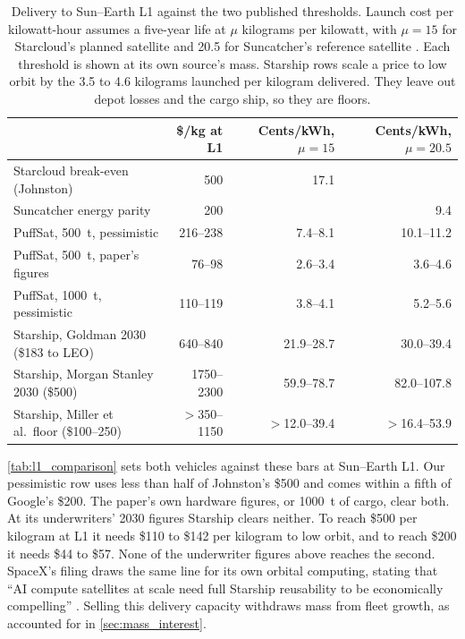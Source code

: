 \documentclass{article}
\begin{document}
\begin{table}[!htpb]
    \centering
    \small
    \caption{Delivery to Sun--Earth L1 against the two published thresholds. Launch cost per kilowatt-hour assumes a five-year life at $\mu$ kilograms per kilowatt, with $\mu = 15$ for Starcloud's planned satellite and 20.5 for Suncatcher's reference satellite \cite{bennici2026_johnston,aguera2026_suncatcher}. Each threshold is shown at its own source's mass. Starship rows scale a price to low orbit by the 3.5 to 4.6 kilograms launched per kilogram delivered. They leave out depot losses and the cargo ship, so they are floors.}
    \label{tab:l1_comparison}
    \begin{tabular}{|l|r|r|r|}\hline
        & \textbf{\$/kg at L1} & \textbf{Cents/kWh, $\mu = 15$} & \textbf{Cents/kWh, $\mu = 20.5$} \\\hline
        Starcloud break-even (Johnston) & 500 & 17.1 & \\\hline
        Suncatcher energy parity & 200 & & 9.4 \\\hline
        PuffSat, \SI{500}{\tonne}, pessimistic & 216--238 & 7.4--8.1 & 10.1--11.2 \\\hline
        PuffSat, \SI{500}{\tonne}, paper's figures & 76--98 & 2.6--3.4 & 3.6--4.6 \\\hline
        PuffSat, \SI{1000}{\tonne}, pessimistic & 110--119 & 3.8--4.1 & 5.2--5.6 \\\hline
        Starship, Goldman 2030 (\$183 to LEO) & 640--840 & 21.9--28.7 & 30.0--39.4 \\\hline
        Starship, Morgan Stanley 2030 (\$500) & 1750--2300 & 59.9--78.7 & 82.0--107.8 \\\hline
        Starship, Miller et al.\ floor (\$100--250) & $>$350--1150 & $>$12.0--39.4 & $>$16.4--53.9 \\\hline
    \end{tabular}
\end{table}

\autoref{tab:l1_comparison} sets both vehicles against these bars at Sun--Earth L1. Our pessimistic row uses less than half of Johnston's \$500 and comes within a fifth of Google's \$200. The paper's own hardware figures, or \SI{1000}{\tonne} of cargo, clear both. At its underwriters' 2030 figures Starship clears neither. To reach \$500 per kilogram at L1 it needs \$110 to \$142 per kilogram to low orbit, and to reach \$200 it needs \$44 to \$57. None of the underwriter figures above reaches the second. SpaceX's filing draws the same line for its own orbital computing, stating that ``AI compute satellites at scale need full Starship reusability to be economically compelling'' \cite{spacex2026_s1a}. Selling this delivery capacity withdraws mass from fleet growth, as accounted for in \autoref{sec:mass_interest}.
\end{document}
